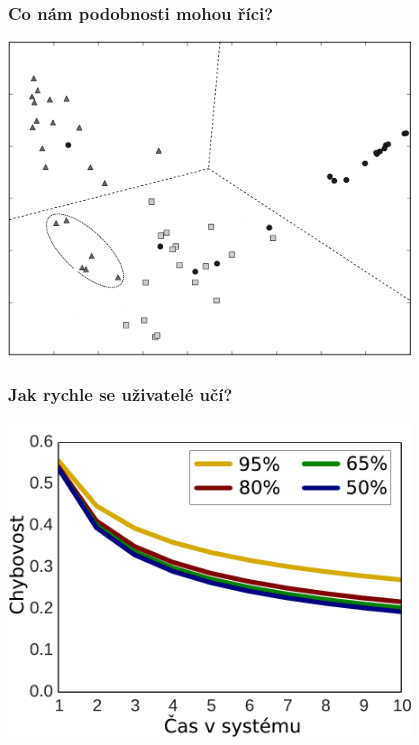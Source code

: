 \documentclass[xcolor=svgnames]{beamer}
\begin{document}
\begin{frame}
	\frametitle{Co nám podobnosti mohou říci?}
	\begin{center}
		\includegraphics[width=0.8\textwidth]{img/binar2.png}
	\end{center}
\end{frame}
\begin{frame}
	\frametitle{Jak rychle se uživatelé učí?}
	\begin{center}
		\includegraphics[width=0.8\textwidth]{img/target_difficulty_context_learning_slope}
	\end{center}
\end{frame}
\end{document}
